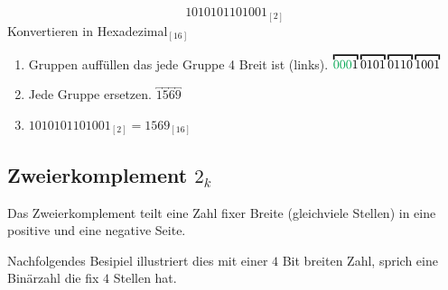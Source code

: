 \documentclass{article}
\begin{document}
\begin{question}[]
    \begin{equation*}
        1010101101001_{[2]}
    \end{equation*}
    Konvertieren in Hexadezimal$_{[16]}$
\end{question}

\begin{answer}[]
    \begin{enumerate}[(1)]
        \item Gruppen auffüllen das jede Gruppe 4 Breit ist (links). $  \overbracket{\textcolor{Green}{000}1}  \overbracket{0101}  \overbracket{0110} \overbracket{1001}$
        \item Jede Gruppe ersetzen. $  \overbracket{1}  \overbracket{5}  \overbracket{6} \overbracket{9}$
        \item $1010101101001_{[2]} = 1569_{[16]}$
    \end{enumerate}
\end{answer}



\subsection{Zweierkomplement $2_k$}

Das Zweierkomplement teilt eine Zahl fixer Breite (gleichviele Stellen) in eine positive und eine negative Seite.

Nachfolgendes Besipiel illustriert dies mit einer $4$ Bit breiten Zahl, sprich eine Binärzahl die fix $4$ Stellen hat.
\end{document}
